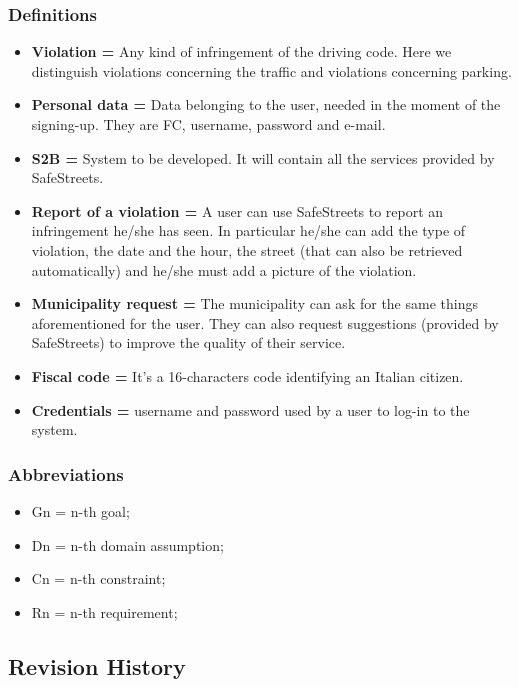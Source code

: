 \documentclass[titlepage]{article}
\begin{document}
\subsubsection{Definitions}
\begin{itemize}
	\item \textbf{Violation =} Any kind of infringement of the driving code. Here we distinguish violations concerning the traffic and violations concerning parking.\\
	\item \textbf{Personal data =} Data belonging to the user, needed in the moment of the signing-up. They are FC, username, password and e-mail.
	\item \textbf{S2B =} System to be developed. It will contain all the services provided by SafeStreets.
	\item \textbf{Report of a violation =} A user can use SafeStreets to report an infringement he/she has seen. In particular he/she can add the type of violation, the date and the hour, the street (that can also be retrieved automatically) and he/she must add a picture of the violation.
	\item \textbf{Municipality request =} The municipality can ask for the same things aforementioned for the user. They can also request suggestions (provided by SafeStreets) to improve the quality of their service.
	\item \textbf{Fiscal code =} It's a 16-characters code identifying an Italian citizen.
	\item \textbf{Credentials =} username and password used by a user to log-in to the system.
	
\end{itemize}
\subsubsection{Abbreviations}

\begin{itemize}

	\item Gn = n-th goal;
	\item Dn = n-th domain assumption;
	\item Cn = n-th constraint;
	\item Rn = n-th requirement;

\end{itemize}


\subsection{Revision History}
\end{document}
